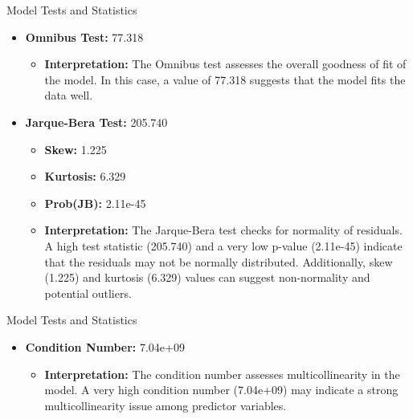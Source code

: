 \documentclass{beamer}
\begin{document}
\begin{frame}{Model Tests and Statistics}
\begin{itemize}
\item \textbf{Omnibus Test:} 77.318
  \begin{itemize}
  \item \textbf{Interpretation:} The Omnibus test assesses the overall goodness of fit of the model. In this case, a value of 77.318 suggests that the model fits the data well.
  \end{itemize}
    
\item \textbf{Jarque-Bera Test:} 205.740
  \begin{itemize}
  \item \textbf{Skew:} 1.225
  \item \textbf{Kurtosis:} 6.329
  \item \textbf{Prob(JB):} 2.11e-45
  \item \textbf{Interpretation:} The Jarque-Bera test checks for normality of residuals. A high test statistic (205.740) and a very low p-value (2.11e-45) indicate that the residuals may not be normally distributed. Additionally, skew (1.225) and kurtosis (6.329) values can suggest non-normality and potential outliers.
  \end{itemize}
\end{itemize}
\end{frame}

\begin{frame}{Model Tests and Statistics}
\begin{itemize}
\item \textbf{Condition Number:} 7.04e+09 
  \begin{itemize}
  \item \textbf{Interpretation:} The condition number assesses multicollinearity in the model. A very high condition number (7.04e+09) may indicate a strong multicollinearity issue among predictor variables.
  \end{itemize}
\end{itemize}
\end{frame}
\end{document}
